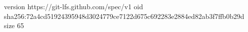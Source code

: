 version https://git-lfs.github.com/spec/v1
oid sha256:72a4cd51924395948d3024779ce7122d675c692283e2884ed82ab3f7ffb0b29d
size 65
